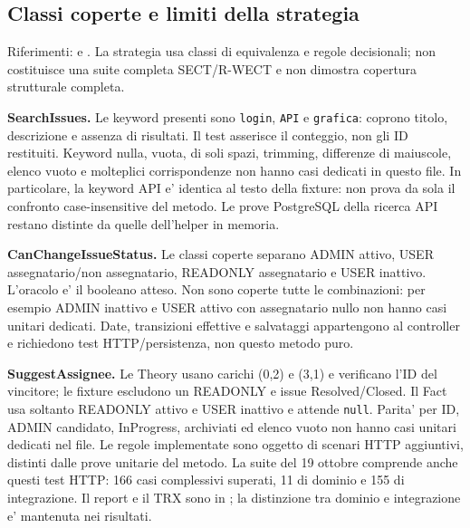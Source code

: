 \subsection{Classi coperte e limiti della strategia}
Riferimenti:  e
. La strategia usa
classi di equivalenza e regole decisionali; non costituisce una suite completa
SECT/R-WECT e non dimostra copertura strutturale completa.

\textbf{SearchIssues.} Le keyword presenti sono \texttt{login}, \texttt{API}
e \texttt{grafica}: coprono titolo, descrizione e assenza di risultati.
Il test asserisce il conteggio, non gli ID restituiti. Keyword nulla, vuota,
di soli spazi, trimming, differenze di maiuscole, elenco vuoto e molteplici
corrispondenze non hanno casi dedicati in questo file. In particolare, la
keyword API e' identica al testo della fixture: non prova da sola il confronto
case-insensitive del metodo. Le prove PostgreSQL della ricerca API restano
distinte da quelle dell'helper in memoria.

\textbf{CanChangeIssueStatus.} Le classi coperte separano ADMIN attivo,
USER assegnatario/non assegnatario, READONLY assegnatario e USER inattivo.
L'oracolo e' il booleano atteso. Non sono coperte tutte le combinazioni:
per esempio ADMIN inattivo e USER attivo con assegnatario nullo non hanno
casi unitari dedicati. Date, transizioni effettive e salvataggi appartengono
al controller e richiedono test HTTP/persistenza, non questo metodo puro.

\textbf{SuggestAssignee.} Le Theory usano carichi (0,2) e (3,1) e verificano
l'ID del vincitore; le fixture escludono un READONLY e issue Resolved/Closed.
Il Fact usa soltanto READONLY attivo e USER inattivo e attende \texttt{null}.
Parita' per ID, ADMIN candidato, InProgress, archiviati ed elenco vuoto non
hanno casi unitari dedicati nel file. Le regole implementate sono oggetto
di scenari HTTP aggiuntivi, distinti dalle prove unitarie del metodo.
La suite del 19 ottobre comprende anche questi
test HTTP: 166 casi complessivi superati, 11 di dominio e 155 di integrazione.
Il report e il TRX sono in ; la distinzione tra
dominio e integrazione e' mantenuta nei risultati.
